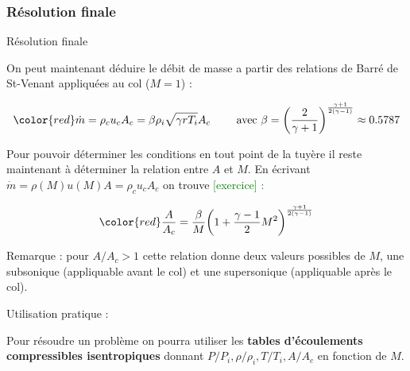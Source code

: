 \subsubsection{Résolution finale}

\begin{frame}{Résolution finale}

\small






On peut maintenant déduire le débit de masse
a partir des relations de Barré de St-Venant appliquées au col ($M=1$) :

$$
\color{red}
\dot m = \rho_c u_c A_c = \beta \rho_i \sqrt{\gamma r T_i} A_c  \qquad \mbox{ avec } 
\beta = {\left(\frac{2}{\gamma+1}\right)}^{\frac{\gamma+1}{2(\gamma-1)}} \approx 0.5787
$$

\pause





Pour pouvoir déterminer les conditions en tout point de la tuyère il reste maintenant à 
déterminer la relation entre $A$ et $M$.  En écrivant $\dot m = \rho(M) u(M) A =  \rho_c u_c A_c$ 
on trouve \textcolor{green}{[exercice] :}

$$
\color{red}
\frac{A}{A_c} = \frac{\beta}{M}  {\left(1 + \frac{\gamma-1}{2}M^2 \right)}^{\frac{\gamma+1}{2(\gamma-1)}}
$$

Remarque : pour $A/A_c>1$ cette relation donne deux valeurs possibles de $M$, une subsonique (appliquable avant le col) et une supersonique (appliquable après le col).


\medskip

\pause
Utilisation pratique :

Pour résoudre un problème on pourra utiliser les {\bf tables d'écoulements compressibles isentropiques} donnant $P/P_i, \rho/\rho_i, T/T_i, A/A_c$ en fonction de $M$.



\vspace{0mm}

\end{frame}


